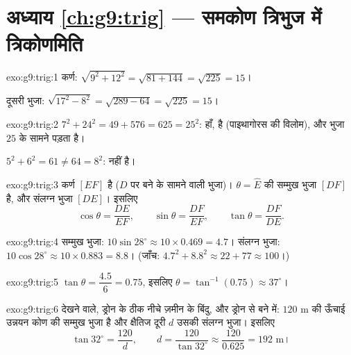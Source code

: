 \section*{अध्याय \ref{ch:g9:trig} --- समकोण त्रिभुज में त्रिकोणमिति}

\begin{solution}{exo:g9:trig:1}
कर्ण: $\sqrt{9^2 + 12^2} = \sqrt{81 + 144} = \sqrt{225} = 15$।

दूसरी  भुजा: $\sqrt{17^2 - 8^2} = \sqrt{289 - 64} = \sqrt{225} = 15$।
\end{solution}

\begin{solution}{exo:g9:trig:2}
$7^2 + 24^2 = 49 + 576 = 625 = 25^2$: हाँ,  है (पाइथागोरस की
विलोम), और  भुजा $25$ के सामने पड़ता है।

$5^2 + 6^2 = 61 \neq 64 = 8^2$:  नहीं है।
\end{solution}

\begin{solution}{exo:g9:trig:3}
कर्ण $[EF]$ है ($D$ पर बने  के सामने वाली भुजा)।
$\theta = \widehat E$ की सम्मुख भुजा $[DF]$ है, और संलग्न भुजा $[DE]$।
इसलिए
\[
\cos\theta = \frac{DE}{EF}, \qquad
\sin\theta = \frac{DF}{EF}, \qquad
\tan\theta = \frac{DF}{DE}.
\]
\end{solution}

\begin{solution}{exo:g9:trig:4}
सम्मुख  भुजा: $10 \sin 28^\circ \approx 10 \times 0.469 = 4.7$।
संलग्न  भुजा: $10 \cos 28^\circ \approx 10 \times 0.883 = 8.8$।
(जाँच: $4.7^2 + 8.8^2 \approx 22 + 77 \approx 100$।)
\end{solution}

\begin{solution}{exo:g9:trig:5}
$\tan\theta = \dfrac{4.5}{6} = 0.75$, इसलिए
$\theta = \tan^{-1}(0.75) \approx 37^\circ$।
\end{solution}

\begin{solution}{exo:g9:trig:6}
देखने वाले, ड्रोन के ठीक नीचे ज़मीन के बिंदु, और ड्रोन से बने  में: $120$ m की ऊँचाई उन्नयन कोण की सम्मुख भुजा है और क्षैतिज
दूरी $d$ उसकी संलग्न भुजा। इसलिए
\[
\tan 32^\circ = \frac{120}{d},
\qquad
d = \frac{120}{\tan 32^\circ} \approx \frac{120}{0.625} = 192 \text{ m।}
\]
\end{solution}

